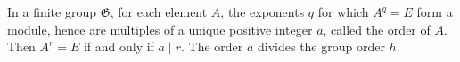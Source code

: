 In a finite group $\mathfrak{G}$, for each element $A$, the exponents $q$ for which $A^q = E$ form a module, hence are multiples of a unique positive integer $a$, called the order of $A$. Then $A^r = E$ if and only if $a \mid r$. The order $a$ divides the group order $h$.
